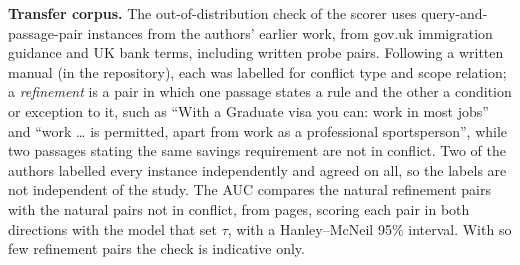 \textbf{Transfer corpus.} The out-of-distribution check of the scorer uses \nOodCorpus{} query-and-passage-pair instances from the authors' earlier work, from gov.uk immigration guidance and UK bank terms, including written probe pairs. Following a written manual (in the repository), each was labelled for conflict type and scope relation; a \emph{refinement} is a pair in which one passage states a rule and the other a condition or exception to it, such as ``With a Graduate visa you can: work in most jobs'' and ``work \dots{} is permitted, apart from work as a professional sportsperson'', while two passages stating the same savings requirement are not in conflict. Two of the authors labelled every instance independently and agreed on all, so the labels are not independent of the study. The AUC compares the \oodPosNatural{} natural refinement pairs with the \oodNegNatural{} natural pairs not in conflict, from \oodNaturalPages{} pages, scoring each pair in both directions with the model that set $\tau$, with a Hanley--McNeil 95\% interval. With so few refinement pairs the check is indicative only.
